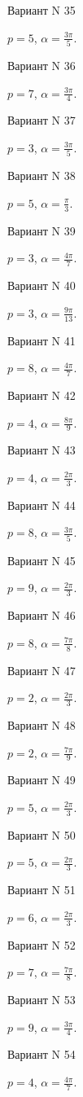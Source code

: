 \documentclass[11pt]{report}
\begin{document}
Вариант N 35

$p = 5$, $\alpha = \frac{3 \pi}{5}$.

Вариант N 36

$p = 7$, $\alpha = \frac{3 \pi}{4}$.

Вариант N 37

$p = 3$, $\alpha = \frac{3 \pi}{5}$.

Вариант N 38

$p = 5$, $\alpha = \frac{\pi}{3}$.

Вариант N 39

$p = 3$, $\alpha = \frac{4 \pi}{7}$.

Вариант N 40

$p = 3$, $\alpha = \frac{9 \pi}{13}$.

Вариант N 41

$p = 8$, $\alpha = \frac{4 \pi}{7}$.

Вариант N 42

$p = 4$, $\alpha = \frac{8 \pi}{9}$.

Вариант N 43

$p = 4$, $\alpha = \frac{2 \pi}{3}$.

Вариант N 44

$p = 8$, $\alpha = \frac{3 \pi}{5}$.

Вариант N 45

$p = 9$, $\alpha = \frac{2 \pi}{3}$.

Вариант N 46

$p = 8$, $\alpha = \frac{7 \pi}{8}$.

Вариант N 47

$p = 2$, $\alpha = \frac{2 \pi}{3}$.

Вариант N 48

$p = 2$, $\alpha = \frac{7 \pi}{9}$.

Вариант N 49

$p = 5$, $\alpha = \frac{2 \pi}{3}$.

Вариант N 50

$p = 5$, $\alpha = \frac{2 \pi}{3}$.

Вариант N 51

$p = 6$, $\alpha = \frac{2 \pi}{3}$.

Вариант N 52

$p = 7$, $\alpha = \frac{7 \pi}{8}$.

Вариант N 53

$p = 9$, $\alpha = \frac{3 \pi}{4}$.

Вариант N 54

$p = 4$, $\alpha = \frac{4 \pi}{7}$.
\end{document}

